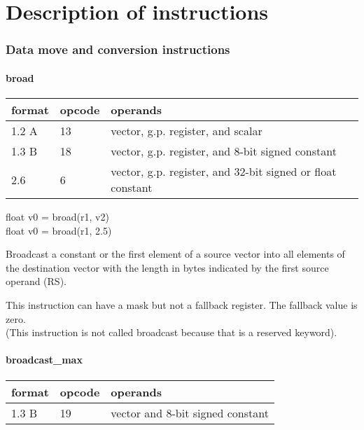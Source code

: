 \documentclass[forwardcom.tex]{subfiles}
\begin{document}
\RaggedRight

\chapter{Description of instructions}\label{chap:DescriptionOfInstructions}

\subsection{Data move and conversion instructions}

\subsubsection{broad}

\label{table:broadInstruction}
\begin{tabular}{|p{12mm}|p{12mm}|p{110mm}|}
\hline
\bfseries format & \bfseries opcode & \bfseries operands \\ \hline
1.2 A & 13 & vector, g.p. register, and scalar \\ \hline
1.3 B & 18 & vector, g.p. register, and 8-bit signed constant \\ \hline
2.6   &  6 & vector, g.p. register, and 32-bit signed or float constant \\ \hline
\end{tabular}
\vspace{2mm}

float v0 = broad(r1, v2)\\
float v0 = broad(r1, 2.5)
\vspace{2mm}

Broadcast a constant or the first element of a source vector into all
elements of the destination vector with the length in bytes indicated by the first source operand (RS).
\vspace{2mm}

This instruction can have a mask but not a fallback register. The fallback value is zero.\\
(This instruction is not called broadcast because that is a reserved keyword).


\subsubsection{broadcast\_max}

\label{table:broadcastMaxInstruction}
\begin{tabular}{|p{12mm}|p{12mm}|p{110mm}|}
\hline
\bfseries format & \bfseries opcode & \bfseries operands \\ \hline
1.3 B & 19 & vector and 8-bit signed constant \\ \hline
\end{tabular}
\vspace{2mm}
\end{document}
